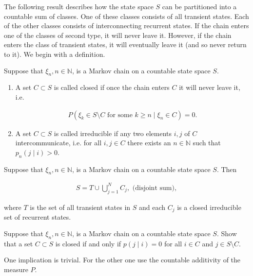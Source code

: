 The following result describes how the state space $S$ can be partitioned into a countable sum of classes. One of these classes consists of all transient states. Each of the other classes consists of interconnecting recurrent states. If the chain enters one of the classes of second type, it will never leave it. However, if the chain enters the class of transient states, it will eventually leave it (and so never return to it). We begin with a definition.

\begin{Definition}
\label{def:closed-irreducible}
Suppose that $\xi_n, n\in\mathbb{N}$, is a Markov chain on a countable state space $S$.

\begin{enumerate}
\item A set $C \subset S$ is called closed if once the chain enters $C$ it will never leave it, i.e.

\begin{align}
P(\xi_k \in S\setminus C \text{ for some } k \geq n \mid \xi_n \in C) = 0. \tag{5.45}
\end{align}

\item A set $C \subset S$ is called irreducible if any two elements $i, j$ of $C$ intercommunicate, i.e. for all $i, j\in C$ there exists an $n\in\mathbb{N}$ such that $p_n(j \mid i) > 0$.
\end{enumerate}
\end{Definition}

\begin{Theorem}
\label{thrm:state-space-decomposition}
Suppose that $\xi_n, n\in\mathbb{N}$, is a Markov chain on a countable state space $S$. Then

\begin{align}
S = T \cup \bigcup_{j=1}^N C_j, \text{ (disjoint sum)}, \tag{5.46}
\end{align}

where $T$ is the set of all transient states in $S$ and each $C_j$ is a closed irreducible set of recurrent states.
\end{Theorem}

\begin{Exercise}
\label{exr:closed-characterization}
Suppose that $\xi_n, n\in\mathbb{N}$, is a Markov chain on a countable state space $S$. Show that a set $C \subset S$ is closed if and only if $p(j \mid i) = 0$ for all $i\in C$ and $j\in S\setminus C$.

\begin{hint}
One implication is trivial. For the other one use the countable additivity of the measure $P$.
\end{hint}
\end{Exercise}


